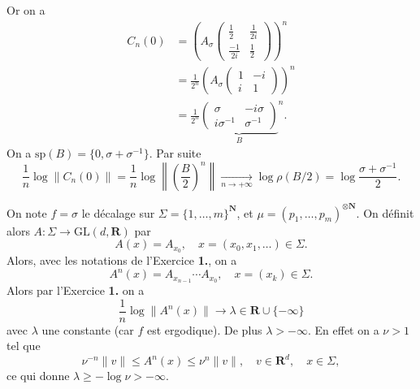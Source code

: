 \documentclass[a4paper,12pt,openany]{article}
\theoremstyle{plain}
\theoremstyle{definition}
\newcommand{\R}{\mathbf{R}}
\newcommand{\N}{\mathbf{N}}
\begin{document}
\begin{enumerate}
Or on a 
$$
\begin{aligned}
C_n(0) &= \left( A_\sigma \begin{pmatrix} {\frac{1}{2}} &  {\frac{1}{2i}} \\  {\frac{-1}{2i}} &  {\frac{1}{2}} \end{pmatrix}  \right)^n   \\
&= \frac{1}{2^n} \left(A_\sigma \begin{pmatrix} 1 & -i \\ i & 1 \end{pmatrix} \right)^n  \\
&= \frac{1}{2^n} \underset{B}{\underbrace{ \begin{pmatrix} \sigma & -i\sigma \\ i\sigma^{-1} & \sigma^{-1} \end{pmatrix}}}^n.
\end{aligned}
$$
 On a $\mathrm{sp}(B) = \{0, \sigma + \sigma^{-1}\}$.  Par suite
$$
\frac{1}{n}\log\|C_n(0)\| = \frac{1}{n} \log \left\|\left(\frac{B}{2}\right)^n\right\|  \underset{n \to +\infty}{\longrightarrow} \log \rho(B/2)  = \log \frac{\sigma + \sigma^{-1}}{2}.
$$

\end{enumerate}
\vspace{0.6cm}


 \vspace{1.5mm}

\noindent
On note $f = \sigma$ le d\'ecalage sur $\Sigma = \{1, \dots, m\}^{\N}$, et $\mu = (p_1, \dots, p_m)^{\otimes \N}$.  On d\'efinit alors $A : \Sigma \to \mathrm{GL}(d, \R)$ par  
$$
A(x) = A_{x_0}, \quad x = (x_0, x_1, \dots) \in \Sigma.
$$
 Alors, avec les notations de l'Exercice \textbf{1.}, on a 
$$
A^n(x) = A_{x_{n-1}} \cdots A_{x_0}, \quad x = (x_k) \in \Sigma.
$$
 Alors par l'Exercice \textbf{1.} on a 
$$
\frac{1}{n} \log \|A^{n}(x)\| \to \lambda \in \R\cup \{-\infty\}
$$
avec $\lambda$ une constante (car $f$ est ergodique).  
De plus $\lambda > - \infty$. En effet on a $\nu > 1$ tel que 
$$
\nu^{-n}\|v\|\leqslant A^n(x) \leqslant \nu^n\|v\|, \quad v \in \R^d, \quad x \in \Sigma,
$$
ce qui donne $\lambda \geqslant - \log \nu > -\infty.$
\vspace{0.6cm}


 \vspace{1.5mm}
\end{document}
